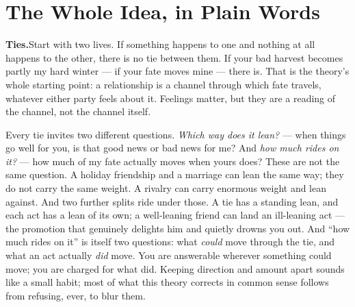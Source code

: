 \section{The Whole Idea, in Plain Words}
\label{sec:explainer:plain}


\textbf{Ties.}\enspace Start with two lives. If something happens to one and nothing at all happens to the other, there is no tie between them. If your bad harvest becomes partly my hard winter --- if your fate moves mine --- there is. That is the theory's whole starting point: a relationship is a channel through which fate travels, whatever either party feels about it. Feelings matter, but they are a reading of the channel, not the channel itself.

Every tie invites two different questions. \emph{Which way does it lean?} --- when things go well for you, is that good news or bad news for me? And \emph{how much rides on it?} --- how much of my fate actually moves when yours does? These are not the same question. A holiday friendship and a marriage can lean the same way; they do not carry the same weight. A rivalry can carry enormous weight and lean against. And two further splits ride under those. A tie has a standing lean, and each act has a lean of its own; a well-leaning friend can land an ill-leaning act --- the promotion that genuinely delights him and quietly drowns you out. And ``how much rides on it'' is itself two questions: what \emph{could} move through the tie, and what an act actually \emph{did} move. You are answerable wherever something could move; you are charged for what did. Keeping direction and amount apart sounds like a small habit; most of what this theory corrects in common sense follows from refusing, ever, to blur them.

